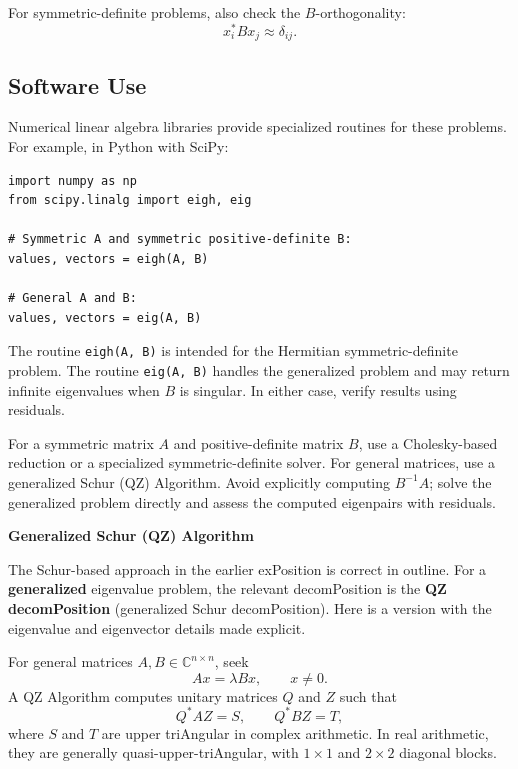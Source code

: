 \documentclass[a4paper, 10pt, onepage]{elegantbook}
\begin{document}
{For symmetric-definite problems, also check the \(B\)-orthogonality:
\[
x_i^*Bx_j\approx \delta_{ij}.
\]

\subsection{Software Use}

\noindent

Numerical linear algebra libraries provide specialized routines for
these problems. For example, in Python with SciPy:

\begin{lstlisting}
import numpy as np
from scipy.linalg import eigh, eig

# Symmetric A and symmetric positive-definite B:
values, vectors = eigh(A, B)

# General A and B:
values, vectors = eig(A, B)
\end{lstlisting}

The routine \texttt{eigh(A, B)} is intended for the Hermitian
symmetric-definite problem. The routine \texttt{eig(A, B)} handles the
generalized problem and may return infinite eigenvalues when \(B\) is
singular. In either case, verify results using residuals.

For a symmetric matrix \(A\) and positive-definite matrix \(B\), use a
Cholesky-based reduction or a specialized symmetric-definite solver.
For general matrices, use a generalized Schur (QZ) Algorithm. Avoid
explicitly computing \(B^{-1}A\); solve the generalized problem directly
and assess the computed eigenpairs with residuals.



    \textbf{Generalized Schur (QZ) Algorithm}  

\noindent

The Schur-based approach in the earlier exPosition is correct in outline.
For a \textbf{generalized} eigenvalue problem, 
the relevant decomPosition is the \textbf{QZ decomPosition} (generalized Schur decomPosition). 
Here is a version with the eigenvalue and eigenvector details made explicit.  

For general matrices \(A,B\in\mathbb{C}^{n\times n}\), seek
\[
Ax=\lambda Bx,
\qquad x\ne 0.
\]
A QZ Algorithm computes unitary matrices \(Q\) and \(Z\) such that
\[
Q^*AZ=S,
\qquad
Q^*BZ=T,
\]
where \(S\) and \(T\) are upper triAngular in complex arithmetic.
In real arithmetic, they are generally quasi-upper-triAngular, with
\(1\times1\) and \(2\times2\) diagonal blocks.

}
\end{document}
